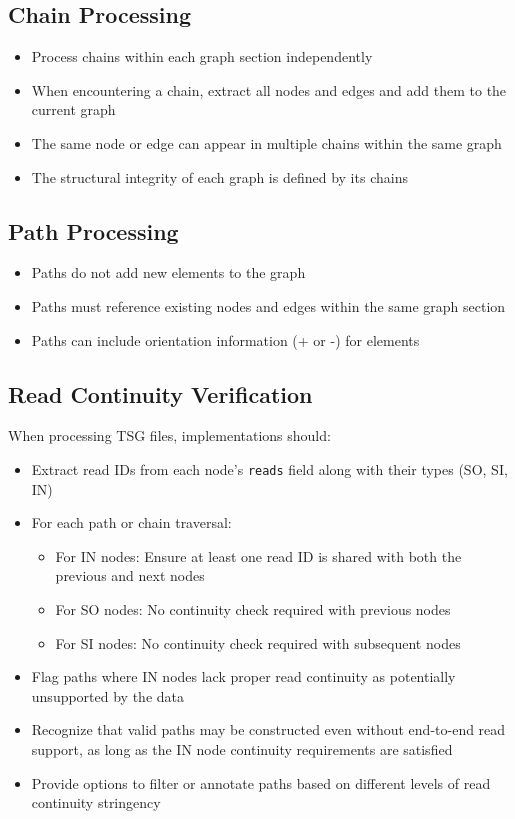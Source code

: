 \documentclass[11pt,a4paper]{article}
\begin{document}
\subsection{Chain Processing}

\begin{itemize}[leftmargin=*]
	\item Process chains within each graph section independently
	\item When encountering a chain, extract all nodes and edges and add them to the current graph
	\item The same node or edge can appear in multiple chains within the same graph
	\item The structural integrity of each graph is defined by its chains
\end{itemize}

\subsection{Path Processing}

\begin{itemize}[leftmargin=*]
	\item Paths do not add new elements to the graph
	\item Paths must reference existing nodes and edges within the same graph section
	\item Paths can include orientation information (+ or -) for elements
\end{itemize}

\subsection{Read Continuity Verification}

When processing TSG files, implementations should:

\begin{itemize}[leftmargin=*]
	\item Extract read IDs from each node's \texttt{reads} field along with their types (SO, SI, IN)
	\item For each path or chain traversal:
	      \begin{itemize}
		      \item For IN nodes: Ensure at least one read ID is shared with both the previous and next nodes
		      \item For SO nodes: No continuity check required with previous nodes
		      \item For SI nodes: No continuity check required with subsequent nodes
	      \end{itemize}
	\item Flag paths where IN nodes lack proper read continuity as potentially unsupported by the data
	\item Recognize that valid paths may be constructed even without end-to-end read support, as long as the IN node continuity requirements are satisfied
	\item Provide options to filter or annotate paths based on different levels of read continuity stringency
\end{itemize}
\end{document}
